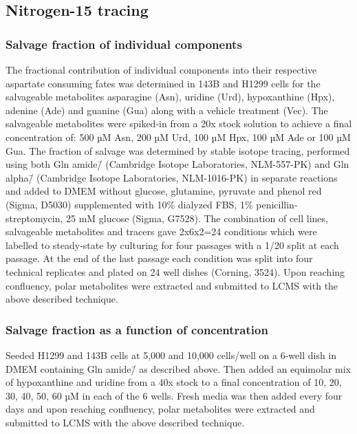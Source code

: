 \subsection{Nitrogen-15 tracing}

\subsubsection{Salvage fraction of individual components}
The fractional contribution of individual components into their respective aspartate consuming fates was determined in 143B and H1299 cells for the salvageable metabolites asparagine (Asn), uridine (Urd), hypoxanthine (Hpx), adenine (Ade) and guanine (Gua) along with a vehicle treatment (Vec).
The salvageable metabolites were spiked-in from a 20x stock solution to achieve a final concentration of: 500 µM Asn, 200 µM Urd, 100 µM Hpx, 100 µM Ade or 100 µM Gua.
The fraction of salvage was determined by stable isotope tracing, performed using both Gln amide\=/\hNi{} (Cambridge Isotope Laboratories, NLM-557-PK) and Gln alpha\=/\hNi{} (Cambridge Isotope Laboratories, NLM-1016-PK) in separate reactions and added to DMEM without glucose, glutamine, pyruvate and phenol red (Sigma, D5030) supplemented with 10\% dialyzed FBS, 1\% penicillin-streptomycin, 25 mM glucose (Sigma, G7528).
The combination of cell lines, salvageable metabolites and tracers gave 2x6x2=24 conditions which were labelled to steady-state by culturing for four passages with a 1/20 split at each passage.
At the end of the last passage each condition was split into four technical replicates and plated on 24 well dishes (Corning, 3524).
Upon reaching confluency, polar metabolites were extracted and submitted to LCMS with the above described technique.

\subsubsection{Salvage fraction as a function of concentration}
Seeded H1299 and 143B cells at 5,000 and 10,000 cells/well on a 6-well dish in DMEM containing Gln amide\=/\hNi{} as described above.
Then added an equimolar mix of hypoxanthine and uridine from a 40x stock to a final concentration of 10, 20, 30, 40, 50, 60 µM in each of the 6 wells.
Fresh media was then added every four days and upon reaching confluency, polar metabolites were extracted and submitted to LCMS with the above described technique.








